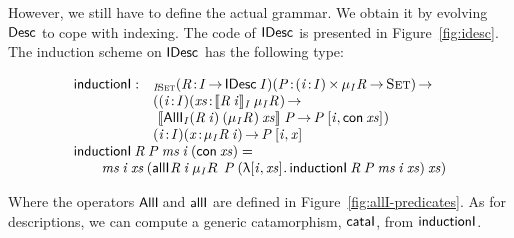 However, we still have to define the actual grammar. We obtain it by
evolving $\Desc$ to cope with indexing.  The code of $\IDesc{\!}$ is presented in
Figure~\ref{fig:idesc}. The induction scheme on $\IDesc{\!}$ has the
following type:

\[\stk{
\begin{array}{@{}ll}
\F{inductionI} : & _{\Bhab{\V{I}}{\Set}}
                   \PITEL{\V{R}}{\V{I} \To \IDesc{\V{I}}}
                   \PI{\V{P}}{\SIGMA{\V{i}}{\V{I}} \IMu{\V{I}}{\V{R}}{\!} \To \Set} \\
                 & (      \PITEL{\V{i}}{\V{I}} 
                          \PI{\V{xs}}{\idescop{\V{R}\: \V{i}}{\V{I}}{\IMu{\V{I}}{\V{R}}{\!}}} \\
                 & \   \idescop{\AllI{\V{I}}
                                     {(\V{R}\: \V{i})}
                                     {(\IMu{\V{I}}{\V{R}}{\!})}
                                     {\V{xs}}}
                               {}
                               {\V{P}} \To
                       \V{P}\: \pair{\V{i}}{\Con{\V{xs}}}{}) \\
                 & \PITEL{\V{i}}{\V{I}}
                   \PI{\V{x}}{\IMu{\V{I}}{\V{R}}{\V{i}}}
                   \V{P}\: \pair{\V{i}}{\V{x}}{}
\end{array} \\
\F{inductionI}\: \V{R}\: \V{P}\: \V{ms}\: \V{i}\: (\Con{\V{xs}}) =  \\
\qquad
    \V{ms}\: \V{i}\: \V{xs}\: (\allI{}
                                    {\V{R}\: \V{i}}
                                    {\IMu{\V{I}}{R}{}}
                                    {\V{P}}
                                    {(\LAM{\pair{\V{i}}{\V{xs}}{}} \F{inductionI}\: \V{R}\: \V{P}\: \V{ms}\: \V{i}\: \V{xs})}
                                    {\V{xs}})
}\]

Where the operators $\AllI{\!}{\!}{\!}{\!}$ and
$\allI{\!}{\!}{\!}{\!}{\!}{\!}$ are defined in
Figure~\ref{fig:allI-predicates}. As for descriptions, we can compute
a generic catamorphism, $\F{cataI}$, from $\F{inductionI}$.


